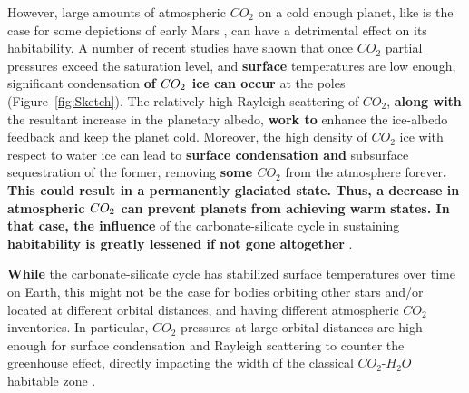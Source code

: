 \documentclass[fleqn,usenatbib]{mnras}
\providecommand{\DIFadd}[1]{{\bf #1}} %
\providecommand{\DIFdel}[1]{} %
\providecommand{\DIFaddbegin}{} %
\providecommand{\DIFaddend}{} %
\providecommand{\DIFdelbegin}{} %
\providecommand{\DIFdelend}{} %
\newcommand{\DIFscaledelfig}{0.5}
\newlength{\DIFdelgraphicswidth} %
\newlength{\DIFdelgraphicsheight} %
\newcommand{\DIFaddincludegraphics}[2][]{{\color{blue}\fbox{\DIFOincludegraphics[#1]{#2}}}} %
\newcommand{\DIFdelincludegraphics}[2][]{%
\sbox{\DIFdelgraphicsbox}{\DIFOincludegraphics[#1]{#2}}%
\settoboxwidth{\DIFdelgraphicswidth}{\DIFdelgraphicsbox} %
\settoboxtotalheight{\DIFdelgraphicsheight}{\DIFdelgraphicsbox} %
\scalebox{\DIFscaledelfig}{%
\parbox[b]{\DIFdelgraphicswidth}{\usebox{\DIFdelgraphicsbox}\\[-\baselineskip] \rule{\DIFdelgraphicswidth}{0em}}\llap{\resizebox{\DIFdelgraphicswidth}{\DIFdelgraphicsheight}{%
\setlength{\unitlength}{\DIFdelgraphicswidth}%
\begin{picture}(1,1)%
\thicklines\linethickness{2pt} %
{\color[rgb]{1,0,0}\put(0,0){\framebox(1,1){}}}%
{\color[rgb]{1,0,0}\put(0,0){\line( 1,1){1}}}%
{\color[rgb]{1,0,0}\put(0,1){\line(1,-1){1}}}%
\end{picture}%
}\hspace*{3pt}}} %
} %
\DeclareRobustCommand{\DIFaddbegin}{\DIFOaddbegin \let\includegraphics\DIFaddincludegraphics} %
\DeclareRobustCommand{\DIFaddend}{\DIFOaddend \let\includegraphics\DIFOincludegraphics} %
\DeclareRobustCommand{\DIFdelbegin}{\DIFOdelbegin \let\includegraphics\DIFdelincludegraphics} %
\DeclareRobustCommand{\DIFdelend}{\DIFOaddend \let\includegraphics\DIFOincludegraphics} %
\begin{document}
However, large amounts of atmospheric $CO_{\mathrm{2}}$ on a cold enough planet, like is the case for some depictions of early Mars \citep{Kasting1991,wordsworth2013}, can have a detrimental effect on its habitability. A number of recent studies \DIFdelbegin \DIFdel{\citep{Kasting1991,Phumbert2005,Phumbert2011, Soto2015, Turbet2017} }\DIFdelend \DIFaddbegin \DIFadd{\citep{Kasting1991,Phumbert2005,Phumbert2011, forget2013,Soto2015, Turbet2017,kadoya_outer_2019} }\DIFaddend have shown that once $CO_{\mathrm{2}}$ partial pressures exceed the saturation level, and \DIFaddbegin \DIFadd{surface }\DIFaddend temperatures are low enough, significant condensation \DIFdelbegin \DIFdel{occurs }\DIFdelend \DIFaddbegin \DIFadd{of $CO_{\rm 2}$ ice can occur }\DIFaddend at the poles \DIFdelbegin \DIFdel{, triggering collapse }\DIFdelend (Figure~\ref{fig:Sketch}). The relatively high Rayleigh scattering of $CO_{\mathrm{2}}$, \DIFdelbegin \DIFdel{and }\DIFdelend \DIFaddbegin \DIFadd{along with }\DIFaddend the resultant increase in the planetary albedo, \DIFdelbegin \DIFdel{further }\DIFdelend \DIFaddbegin \DIFadd{work to }\DIFaddend enhance the ice-albedo feedback \citep{Kasting1991} and keep the planet cold. Moreover, the high density of $CO_{\mathrm{2}}$ ice with respect to water ice can lead to \DIFaddbegin \DIFadd{surface condensation and }\DIFaddend subsurface sequestration of the former, removing \DIFdelbegin \DIFdel{it }\DIFdelend \DIFaddbegin \DIFadd{some $CO_{\mathrm{2}}$ }\DIFaddend from the atmosphere forever\DIFdelbegin \DIFdel{, resulting in a permanent stateof glaciation. Such a scenario potentially removes or greatly mitigates the role }\DIFdelend \DIFaddbegin \DIFadd{. This could result in a permanently glaciated state. Thus, a decrease in atmospheric $CO_{\rm 2}$  can prevent planets from achieving warm states. In that case,  the influence }\DIFaddend of the carbonate-silicate cycle in sustaining \DIFdelbegin \DIFdel{habitable surface conditions }\DIFdelend \DIFaddbegin \DIFadd{habitability is greatly lessened if not gone altogether }\DIFaddend \citep{Turbet2017}.  

\DIFdelbegin \DIFdel{Thus, while }\DIFdelend \DIFaddbegin \DIFadd{While }\DIFaddend the carbonate-silicate cycle has stabilized surface temperatures over time on Earth, this might not be the case for bodies orbiting other stars and/or located at different orbital distances, and having different atmospheric $CO_{\mathrm{2}}$ inventories. In particular, $CO_{\mathrm{2}}$ pressures at large orbital distances are high enough for surface condensation and Rayleigh scattering to counter the greenhouse effect, directly impacting the width of the classical $CO_{\mathrm{2}}$-$H_{\mathrm{2}}O$ habitable zone \citep{kasting1993,KumarKopparapu2013, Ramirez2018}. 
\end{document}
